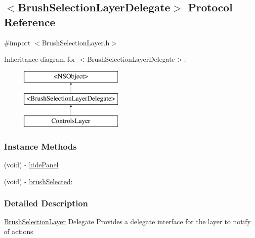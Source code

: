 \hypertarget{protocol_brush_selection_layer_delegate-p}{\subsection{$<$Brush\-Selection\-Layer\-Delegate$>$ Protocol Reference}
\label{d7/dd2/protocol_brush_selection_layer_delegate-p}
}


{\ttfamily \#import $<$Brush\-Selection\-Layer.\-h$>$}

Inheritance diagram for $<$Brush\-Selection\-Layer\-Delegate$>$\-:\begin{figure}[H]
\begin{center}
\leavevmode
\includegraphics[height=3.000000cm]{d7/dd2/protocol_brush_selection_layer_delegate-p}
\end{center}
\end{figure}
\subsubsection*{Instance Methods}
\begin{DoxyCompactItemize}
\item 
(void) -\/ \hyperlink{protocol_brush_selection_layer_delegate-p_a22d681b5b588c7524638b37e1331057e}{hide\-Panel}
\item 
(void) -\/ \hyperlink{protocol_brush_selection_layer_delegate-p_ad5ad967fe1efe627f46296129703f8f8}{brush\-Selected\-:}
\end{DoxyCompactItemize}


\subsubsection{Detailed Description}
\hyperlink{interface_brush_selection_layer}{Brush\-Selection\-Layer} Delegate Provides a delegate interface for the layer to notify of actions 

